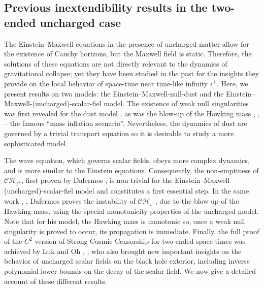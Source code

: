 \documentclass[10pt,a4paper]{article}
\theoremstyle{plain}
\theoremstyle{remark}
\theoremstyle{definition}
\theoremstyle{plain}
\theoremstyle{remark}
\theoremstyle{definition}
\newcommand{\CH}{\mathcal{CH}_{i^+}}
\numberwithin{equation}{section}
\begin{document}
\subsection{Previous inextendibility results in the two-ended uncharged case} \label{previouswork}

The Einstein--Maxwell equations in the presence of uncharged matter allow for the existence of Cauchy horizons, but the Maxwell field is static. Therefore, the solutions of these equations are not directly relevant to the dynamics of gravitational collapse; yet they have been studied in the past for the insights they provide on the local behavior of space-time near time-like infinity $i^+$. Here, we present results on two models: the Einstein--Maxwell-null-dust %
and the Einstein--Maxwell-(uncharged)-scalar-fiel model. %
The existence of weak null singularities was first revealed for the dust model \cite{Hiscock}, as was the blow-up of the Hawking mass \cite{Ori}, \cite{Poisson}, \cite{PoissonIsrael} -- the famous ``mass inflation scenario''. Nevertheless, the dynamics of dust are governed by a trivial transport equation so it is desirable to study a more sophisticated model.

The wave equation, which governs scalar fields, obeys more complex dynamics, and is more similar to the Einstein equations. Consequently, the non-emptiness of $\CH$, first proven by Dafermos \cite{MihalisPHD}, is non trivial for the Einstein--Maxwell-(uncharged)-scalar-fiel model and constitutes a first essential step. In the same work \cite{MihalisPHD}, \cite{Mihalis1}, Dafermos proves the instability of $\CH$, due to the blow up of the Hawking mass, using the special monotonicity properties of the uncharged model. Note that for his model, the Hawking mass is monotonic so, once a weak null singularity is proved to occur, its propagation is immediate. Finally, the full proof of the $C^2$ version of Strong Cosmic Censorship for two-ended space-times was achieved by Luk and Oh \cite{JonathanStab}, \cite{JonathanStabExt}, who also brought new important insights on the behavior of uncharged scalar fields on the black hole exterior, including inverse polynomial lower bounds on the decay of the scalar field. We now give a detailed account of these different results.
\end{document}
